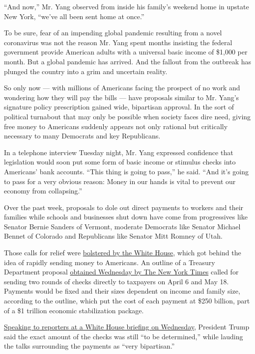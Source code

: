 ``And now,'' Mr. Yang observed from inside his family's weekend home in
upstate New York, ``we've all been sent home at once.''

To be sure, fear of an impending global pandemic resulting from a novel
coronavirus was not the reason Mr. Yang spent months insisting the
federal government provide American adults with a universal basic income
of \$1,000 per month. But a global pandemic has arrived. And the fallout
from the outbreak has plunged the country into a grim and uncertain
reality.

So only now --- with millions of Americans facing the prospect of no
work and wondering how they will pay the bills --- have proposals
similar to Mr. Yang's signature policy prescription gained wide,
bipartisan approval. In the sort of political turnabout that may only be
possible when society faces dire need, giving free money to Americans
suddenly appears not only rational but critically necessary to many
Democrats and key Republicans.

In a telephone interview Tuesday night, Mr. Yang expressed confidence
that legislation would soon put some form of basic income or stimulus
checks into Americans' bank accounts. ``This thing is going to pass,''
he said. ``And it's going to pass for a very obvious reason: Money in
our hands is vital to prevent our economy from collapsing.''

Over the past week, proposals to dole out direct payments to workers and
their families while schools and businesses shut down have come from
progressives like Senator Bernie Sanders of Vermont, moderate Democrats
like Senator Michael Bennet of Colorado and Republicans like Senator
Mitt Romney of Utah.

Those calls for relief were
\href{https://www.nytimes3xbfgragh.onion/2020/03/17/us/politics/stimulus-package.html?action=click\&module=Spotlight\&pgtype=Homepage}{bolstered
by the White House}, which got behind the idea of rapidly sending money
to Americans. An outline of a Treasury Department proposal
\href{https://www.nytimes3xbfgragh.onion/2020/03/18/us/politics/donald-trump-coronavirus-trump-stimulus.html}{obtained
Wednesday by The New York Times} called for sending two rounds of checks
directly to taxpayers on April 6 and May 18. Payments would be fixed and
their sizes dependent on income and family size, according to the
outline, which put the cost of each payment at \$250 billion, part of a
\$1 trillion economic stabilization package.

\href{https://www.c-span.org/video/?470459-1/president-trump-invokes-defense-production-act-response-coronavirus\&start=1536}{Speaking
to reporters at a White House briefing on Wednesday}, President Trump
said the exact amount of the checks was still ``to be determined,''
while lauding the talks surrounding the payments as ``very bipartisan.''

